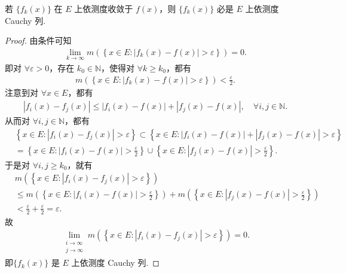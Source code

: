 \documentclass[../../main.tex]{subfiles}%
\begin{document}
\begin{theorem}\label{theorem:依测度收敛必是依测度Cauchy列}
若 $\{f_k(x)\}$ 在 $E$ 上依测度收敛于 $f(x)$，则 $\{f_k(x)\}$ 必是 $E$ 上依测度 Cauchy 列.
\end{theorem}
\begin{proof}

由条件可知
\begin{align*}
\lim_{k\rightarrow\infty}m\left(\left\{x\in E:\left|f_k(x)-f(x)\right|>\varepsilon\right\}\right)=0.
\end{align*}
即对 $\forall\varepsilon > 0$，存在 $k_0\in\mathbb{N}$，使得对 $\forall k\geqslant k_0$，都有
\begin{align*}
m\left(\left\{x\in E:\left|f_k(x)-f(x)\right|>\varepsilon\right\}\right)<\frac{\varepsilon}{2}.
\end{align*}
注意到对 $\forall x\in E$，都有
\begin{align*}
\left|f_i(x)-f_j(x)\right|\leqslant\left|f_i(x)-f(x)\right|+\left|f_j(x)-f(x)\right|,\quad\forall i,j\in\mathbb{N}.
\end{align*}
从而对 $\forall i,j\in\mathbb{N}$，都有
\begin{align*}
&\left\{x\in E:\left|f_i(x)-f_j(x)\right|>\varepsilon\right\}\subset\left\{x\in E:\left|f_i(x)-f(x)\right|+\left|f_j(x)-f(x)\right|>\varepsilon\right\}\\
&=\left\{x\in E:\left|f_i(x)-f(x)\right|>\frac{\varepsilon}{2}\right\}\cup\left\{x\in E:\left|f_j(x)-f(x)\right|>\frac{\varepsilon}{2}\right\}.
\end{align*}
于是对 $\forall i,j\geqslant k_0$，就有
\begin{align*}
&m\left(\left\{x\in E:\left|f_i(x)-f_j(x)\right|>\varepsilon\right\}\right)\\
&\leqslant m\left(\left\{x\in E:\left|f_i(x)-f(x)\right|>\frac{\varepsilon}{2}\right\}\right)+m\left(\left\{x\in E:\left|f_j(x)-f(x)\right|>\frac{\varepsilon}{2}\right\}\right)\\
&<\frac{\varepsilon}{2}+\frac{\varepsilon}{2}=\varepsilon.
\end{align*}
故
\begin{align*}
\lim_{\substack{i\rightarrow\infty\\j\rightarrow\infty}}m\left(\left\{x\in E:\left|f_i(x)-f_j(x)\right|>\varepsilon\right\}\right)=0.
\end{align*}
即$\{f_k(x)\}$ 是 $E$ 上依测度 Cauchy 列.

\end{proof}
\end{document}
